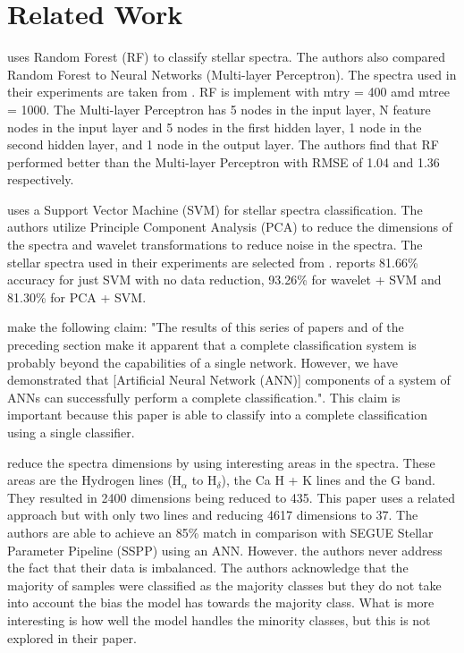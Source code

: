 \documentclass[./AutomatedMK.tex]{subfiles}
\begin{document}
\section{Related Work}\label{sec:related}

\citeauthor{YI} uses Random Forest (RF) to classify stellar spectra. The authors also compared Random Forest to Neural Networks (Multi-layer Perceptron). The spectra used in their experiments are taken from \citeauthor{Pickles}. RF is implement with mtry = 400 amd mtree = 1000. The Multi-layer Perceptron has 5 nodes in the input layer, N feature nodes in the input layer and 5 nodes in the first hidden layer, 1 node in the second hidden layer, and 1 node in the output layer. The authors find that RF performed better than the Multi-layer Perceptron with RMSE of 1.04 and 1.36 respectively. 

\citeauthor{Xing} uses a Support Vector Machine (SVM) for stellar spectra classification. The authors utilize Principle Component Analysis (PCA) to reduce the dimensions of the spectra and wavelet transformations to reduce noise in the spectra. The stellar spectra used in their experiments are selected from \citeauthor{Jacoby}. \citeauthor{Xing} reports 81.66\% accuracy for just SVM with no data reduction, 93.26\% for wavelet + SVM and 81.30\% for PCA + SVM.

\citeauthor{Weaver} make the following claim: "The results of this series of papers and of the preceding section make it apparent that a complete classification system is probably beyond the capabilities of a single network. However, we have demonstrated that [Artificial Neural Network (ANN)] components of a system of ANNs can successfully perform a complete classification.". This claim is important because this paper is able to classify into a complete classification using a single classifier.

\citeauthor{Schierscher} reduce the spectra dimensions by using interesting areas in the spectra. These areas are the Hydrogen lines (H$_\alpha$ to H$_\delta$), the Ca H + K lines and the G band. They resulted in 2400 dimensions being reduced to 435. This paper uses a related approach but with only two lines and reducing 4617 dimensions to 37. The authors are able to achieve an 85\% match in comparison with SEGUE Stellar Parameter Pipeline (SSPP) using an ANN. However. the authors never address the fact that their data is imbalanced. The authors acknowledge that the majority of samples were classified as the majority classes but they do not take into account the bias the model has towards the majority class. What is more interesting is how well the model handles the minority classes, but this is not explored in their paper.
\end{document}
